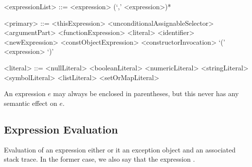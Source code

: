 \documentclass[makeidx]{article}
\begin{document}
{\begin{grammar}
<expressionList> ::= <expression> (`,' <expression>)*

<primary> ::= <thisExpression>
  \alt \SUPER{} <unconditionalAssignableSelector>
  \alt \SUPER{} <argumentPart>
  \alt <functionExpression>
  \alt <literal>
  \alt <identifier>
  \alt <newExpression>
  \alt <constObjectExpression>
  \alt <constructorInvocation>
  \alt `(' <expression> `)'

<literal> ::= <nullLiteral>
  \alt <booleanLiteral>
  \alt <numericLiteral>
  \alt <stringLiteral>
  \alt <symbolLiteral>
  \alt <listLiteral>
  \alt <setOrMapLiteral>
\end{grammar}

\LMHash{}%
An expression $e$ may always be enclosed in parentheses,
but this never has any semantic effect on $e$.



\subsection{Expression Evaluation}

\LMHash{}%
Evaluation of an expression either
or it
an exception object and an associated stack trace.
In the former case, we also say that the expression
.

}
\end{document}
